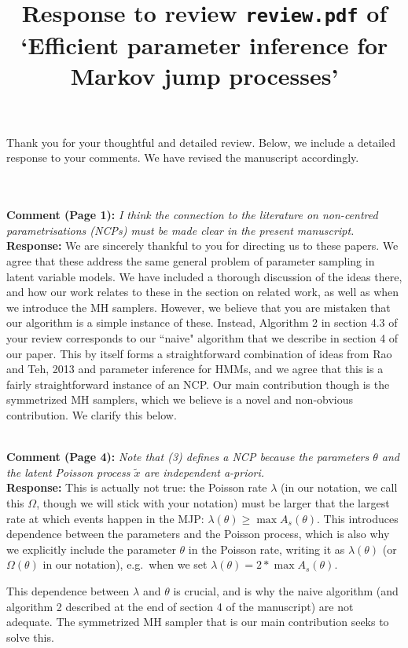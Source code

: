 \documentclass[11pt]{article}
\title{Response to review {\texttt{review.pdf}} of `Efficient parameter inference for Markov jump processes'}
\author{}
\date{}
\newcommand{\rev}[2]{\textbf{Comment #1: }\emph{#2}}
\newcommand{\resp}{\textbf{Response: }}
\begin{document}
\maketitle

Thank you for your thoughtful and detailed review. Below, we include a detailed response to your comments. We have revised the manuscript accordingly. 

~\\~\\
\rev{(Page 1)}{I think the connection to the literature on non-centred parametrisations (NCPs) must be made clear in the present manuscript.}\\ 
\resp 
We are sincerely thankful to you for directing us to these papers. We agree that these address the same general problem of parameter sampling in latent variable models. 
We have included a thorough discussion of the ideas there, and how our work relates to these in the section on related work, as well as when we introduce the MH samplers.
However, we believe that you are mistaken that our algorithm is a simple instance of these. 
Instead, Algorithm 2 in section 4.3 of your review corresponds to our ``naive" algorithm that we describe in section 4 of our paper. 
This by itself forms a straightforward combination of ideas from Rao and Teh, 2013 and parameter inference for HMMs, and we agree that this is a fairly straightforward instance of an NCP. 
Our main contribution though is the symmetrized MH samplers, which we believe is a novel and non-obvious contribution. We clarify this below.

~\\
\rev{(Page 4)}{Note that (3) defines a NCP because the parameters $\theta$ and the latent Poisson process $\tilde{x}$ are independent a-priori.}\\
\resp{This is actually not true: the Poisson rate $\lambda$ (in our notation, we call this $\Omega$, though we will stick with your notation) must be larger that the largest rate at which events happen in the MJP: 
  $\lambda(\theta) \ge \max A_s(\theta)$. 
  This introduces dependence between the parameters and the Poisson process, which is also why we explicitly include the parameter $\theta$ in the Poisson rate, writing it as $\lambda(\theta)$ (or $\Omega(\theta)$ in our notation), e.g.\ when we set 
$\lambda(\theta) = 2 * \max A_s(\theta)$.}

This dependence between $\lambda$ and $\theta$ is crucial, and is why the naive algorithm (and algorithm 2 described at the end of section 4 of the manuscript) are not adequate. 
The symmetrized MH sampler that is our main contribution seeks to solve this.
\end{document}
